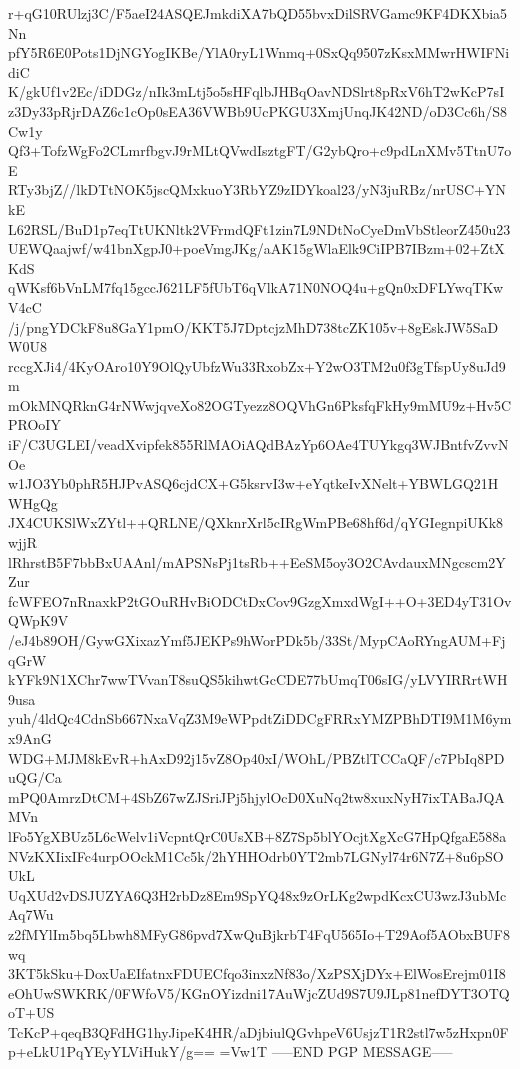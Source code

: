r+qG10RUlzj3C/F5aeI24ASQEJmkdiXA7bQD55bvxDilSRVGamc9KF4DKXbia5Nn
pfY5R6E0Pots1DjNGYogIKBe/YlA0ryL1Wnmq+0SxQq9507zKsxMMwrHWIFNidiC
K/gkUf1v2Ec/iDDGz/nIk3mLtj5o5sHFqlbJHBqOavNDSlrt8pRxV6hT2wKcP7sI
z3Dy33pRjrDAZ6c1cOp0sEA36VWBb9UcPKGU3XmjUnqJK42ND/oD3Cc6h/S8Cw1y
Qf3+TofzWgFo2CLmrfbgvJ9rMLtQVwdIsztgFT/G2ybQro+c9pdLnXMv5TtnU7oE
RTy3bjZ//lkDTtNOK5jscQMxkuoY3RbYZ9zIDYkoal23/yN3juRBz/nrUSC+YNkE
L62RSL/BuD1p7eqTtUKNltk2VFrmdQFt1zin7L9NDtNoCyeDmVbStleorZ450u23
UEWQaajwf/w41bnXgpJ0+poeVmgJKg/aAK15gWlaElk9CiIPB7IBzm+02+ZtXKdS
qWKsf6bVnLM7fq15gccJ621LF5fUbT6qVlkA71N0NOQ4u+gQn0xDFLYwqTKwV4cC
/j/pngYDCkF8u8GaY1pmO/KKT5J7DptcjzMhD738tcZK105v+8gEskJW5SaDW0U8
rccgXJi4/4KyOAro10Y9OlQyUbfzWu33RxobZx+Y2wO3TM2u0f3gTfspUy8uJd9m
mOkMNQRknG4rNWwjqveXo82OGTyezz8OQVhGn6PksfqFkHy9mMU9z+Hv5CPROoIY
iF/C3UGLEI/veadXvipfek855RlMAOiAQdBAzYp6OAe4TUYkgq3WJBntfvZvvNOe
w1JO3Yb0phR5HJPvASQ6cjdCX+G5ksrvI3w+eYqtkeIvXNelt+YBWLGQ21HWHgQg
JX4CUKSlWxZYtl++QRLNE/QXknrXrl5cIRgWmPBe68hf6d/qYGIegnpiUKk8wjjR
lRhrstB5F7bbBxUAAnl/mAPSNsPj1tsRb++EeSM5oy3O2CAvdauxMNgcscm2YZur
fcWFEO7nRnaxkP2tGOuRHvBiODCtDxCov9GzgXmxdWgI++O+3ED4yT31OvQWpK9V
/eJ4b89OH/GywGXixazYmf5JEKPs9hWorPDk5b/33St/MypCAoRYngAUM+FjqGrW
kYFk9N1XChr7wwTVvanT8suQS5kihwtGcCDE77bUmqT06sIG/yLVYIRRrtWH9usa
yuh/4ldQc4CdnSb667NxaVqZ3M9eWPpdtZiDDCgFRRxYMZPBhDTI9M1M6ymx9AnG
WDG+MJM8kEvR+hAxD92j15vZ8Op40xI/WOhL/PBZtlTCCaQF/c7PbIq8PDuQG/Ca
mPQ0AmrzDtCM+4SbZ67wZJSriJPj5hjylOcD0XuNq2tw8xuxNyH7ixTABaJQAMVn
lFo5YgXBUz5L6cWelv1iVcpntQrC0UsXB+8Z7Sp5blYOcjtXgXcG7HpQfgaE588a
NVzKXIixIFc4urpOOckM1Cc5k/2hYHHOdrb0YT2mb7LGNyl74r6N7Z+8u6pSOUkL
UqXUd2vDSJUZYA6Q3H2rbDz8Em9SpYQ48x9zOrLKg2wpdKcxCU3wzJ3ubMcAq7Wu
z2fMYlIm5bq5Lbwh8MFyG86pvd7XwQuBjkrbT4FqU565Io+T29Aof5AObxBUF8wq
3KT5kSku+DoxUaEIfatnxFDUECfqo3inxzNf83o/XzPSXjDYx+ElWosErejm01I8
eOhUwSWKRK/0FWfoV5/KGnOYizdni17AuWjcZUd9S7U9JLp81nefDYT3OTQoT+US
TcKcP+qeqB3QFdHG1hyJipeK4HR/aDjbiulQGvhpeV6UsjzT1R2stl7w5zHxpn0F
p+eLkU1PqYEyYLViHukY/g==
=Vw1T
-----END PGP MESSAGE-----
